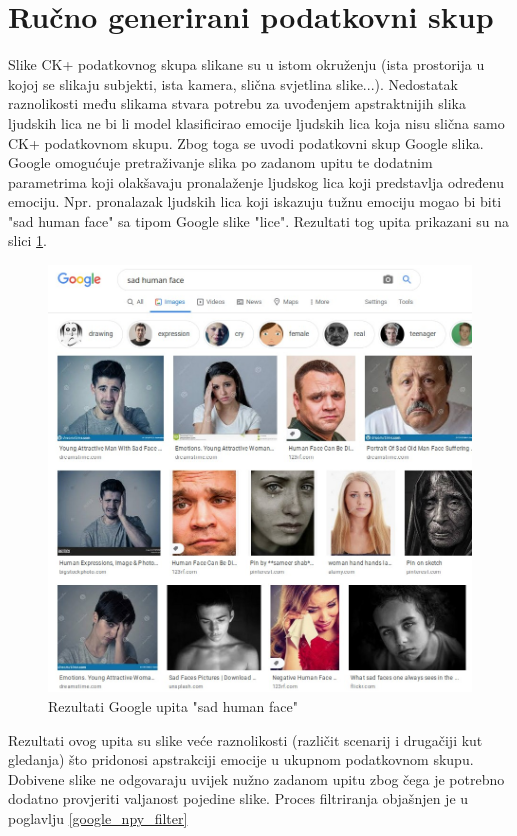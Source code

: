 \documentclass[times, utf8, zavrsni,numeric,pstricks]{fer}
\begin{document}
\section{Ručno generirani podatkovni skup}
Slike CK+ podatkovnog skupa slikane su u istom okruženju (ista prostorija u kojoj se slikaju subjekti, ista kamera, slična svjetlina slike...). Nedostatak raznolikosti među slikama stvara potrebu za uvođenjem apstraktnijih slika ljudskih lica ne bi li model klasificirao emocije ljudskih lica koja nisu slična samo CK+ podatkovnom skupu. Zbog toga se uvodi podatkovni skup Google slika. Google omogućuje pretraživanje slika po zadanom upitu te dodatnim parametrima koji olakšavaju pronalaženje ljudskog lica koji predstavlja određenu emociju. Npr. pronalazak ljudskih lica koji iskazuju tužnu emociju mogao bi biti "sad human face" sa tipom Google slike "lice". Rezultati tog upita prikazani su na slici \ref{pic:google_search_sad}.

\begin{figure}[H]
	\includegraphics[width=\linewidth]{2020-06-08-22-16-22.jpeg}
	\caption{Rezultati Google upita "sad human face"}
	\label{pic:google_search_sad}
\end{figure}

Rezultati ovog upita su slike veće raznolikosti (različit scenarij i drugačiji kut gledanja) što pridonosi apstrakciji emocije u ukupnom podatkovnom skupu. Dobivene slike ne odgovaraju uvijek nužno zadanom upitu zbog čega je potrebno dodatno provjeriti valjanost pojedine slike. Proces filtriranja objašnjen je u poglavlju \ref{google_npy_filter}
\end{document}

